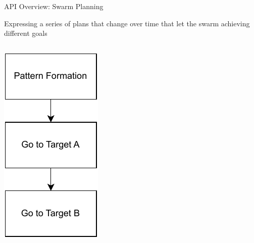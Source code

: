 \documentclass[presentation, 9pt]{beamer}\mode<presentation>{\usetheme{AMSBolognaFC}}
\begin{document}
\begin{frame}[fragile]{API Overview: Swarm Planning}

	Expressing a series of plans that change over time that let the swarm achieving different goals
\vspace{0.4cm}
\begin{columns}
\begin{column}{0.2\textwidth}
\centering
\includegraphics[width=\textwidth]{img/swarm-planner.drawio.pdf}

\end{column}
\end{columns}
\end{frame}
\end{document}
